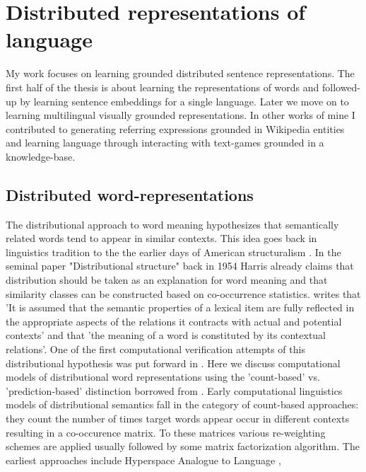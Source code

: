 \section{Distributed representations of language}
My work focuses on learning grounded distributed sentence representations.
The first half of the thesis is about learning the representations of words and followed-up by learning sentence embeddings for a single language. Later we move on to learning multilingual visually grounded representations. In other works of mine I contributed to generating referring expressions grounded in Wikipedia entities and learning language through interacting with text-games grounded in a knowledge-base.

\subsection{Distributed word-representations}
\label{sec:words}
The distributional approach to word meaning hypothesizes that semantically related words
tend to appear in similar contexts. This idea goes back in linguistics tradition to the the
earlier days of American structuralism \cite{nevin2002legacy}. In the seminal paper
"Distributional structure" \cite{harris1954distributional} back in 1954 Harris already claims
that distribution should be taken as an explanation for word meaning and that similarity classes
can be constructed based on co-occurrence statistics.
\cite{cruse1986lexical} writes that 'It is  assumed  that  the  semantic properties  of
a lexical  item  are  fully  reflected  in  the  appropriate  aspects  of  the  relations
it  contracts  with  actual  and  potential  contexts' and that 'the  meaning  of  a word
is constituted  by  its  contextual  relations'. One of the first computational verification
attempts of  this distributional hypothesis was put forward in \cite{miller1991contextual} .
Here we discuss computational models of distributional word representations using the 'count-based' vs.
'prediction-based' distinction borrowed from \cite{baroni2014don}.
Early computational linguistics models of distributional semantics fall in the category of count-based approaches:
they count the number of times target words appear occur in different contexts resulting in a co-occurence matrix.
To these matrices various re-weighting schemes are applied usually followed by some matrix factorization algorithm.
The earliest approaches include Hyperspace Analogue to Language \cite{lund1996producing},
